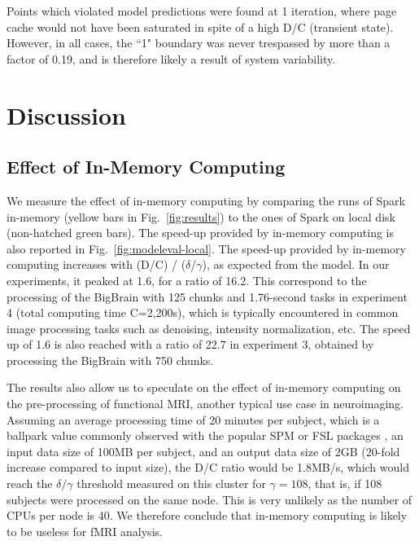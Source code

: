 \documentclass{IEEEtran}
\newcommand{\todo}[1]{\marginpar{\parbox{18mm}{\flushleft\tiny\color{red}\textbf{TODO}:
      #1}}}
\begin{document}
Points which violated 
model predictions were found at 1 iteration, where page cache would not 
have been saturated in spite of a high D/C (transient state). However, 
in all cases, the ``1" boundary was never trespassed by more than a 
factor of 0.19, and is therefore likely a result of system variability.

\section{Discussion} %
\label{sec:discussion}

\subsection{Effect of In-Memory Computing}
We measure the effect of in-memory computing by comparing the runs 
of Spark in-memory (yellow bars in Fig.~\ref{fig:results}) to the ones 
of Spark on local disk (non-hatched green bars). The speed-up provided 
by in-memory computing is also reported in 
Fig.~\ref{fig:modeleval-local}. The speed-up provided by in-memory 
computing increases with (D/C) / ($\delta$/$\gamma$), as expected from 
the model. In our experiments, it peaked at 1.6, for a ratio of 16.2. 
This correspond to the processing of the BigBrain with 125 chunks and 
1.76-second tasks in experiment 4 (total computing time C=2,200s), 
which is typically encountered in common image processing tasks such as 
denoising, intensity normalization, etc. The speed up of 1.6 is also 
reached with a ratio of 22.7 in experiment 3, obtained by processing 
the BigBrain with 750 chunks.

The results also allow us to speculate on the effect of in-memory 
computing on the pre-processing of functional MRI, another typical use 
case in neuroimaging. Assuming an average processing time of 20 minutes 
per subject, which is a ballpark value commonly observed with the 
popular SPM or FSL packages \todo{add refs}, an input data size of 100MB per subject, 
and an output data size of 2GB (20-fold increase compared to input 
size), the D/C ratio would be 1.8MB/s, which would reach the 
$\delta/\gamma$ threshold measured on this cluster for $\gamma=108$, 
that is, if 108 subjects were processed on the same node. This is very 
unlikely as the number of CPUs per node is 40. We therefore conclude 
that in-memory computing is likely to be useless for fMRI analysis.
\end{document}
